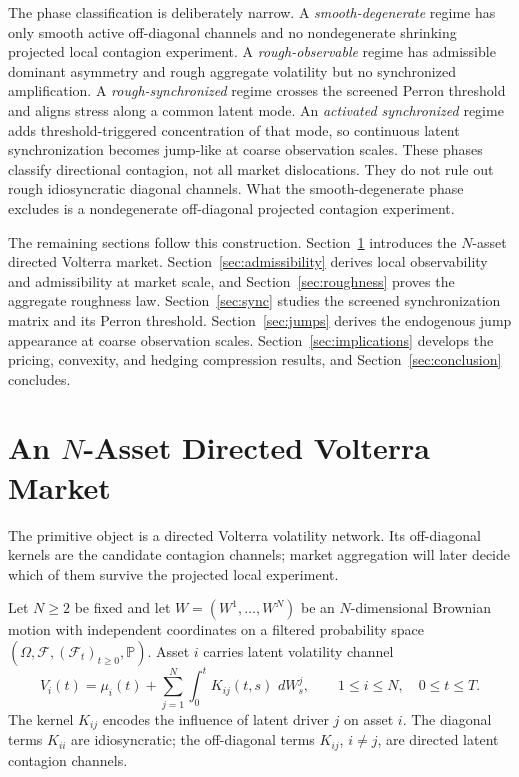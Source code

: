 \documentclass[11pt,a4paper]{amsart}
\theoremstyle{plain}
\theoremstyle{definition}
\theoremstyle{remark}
\newcommand{\PP}{\mathbb{P}}
\newcommand{\dd}{\,d}
\newcommand{\cF}{\mathcal{F}}
\begin{document}
The phase classification is deliberately narrow.  A \emph{smooth-degenerate} regime has only
smooth active off-diagonal channels and no nondegenerate shrinking projected local contagion
experiment.  A \emph{rough-observable} regime has admissible dominant asymmetry and rough aggregate
volatility but no synchronized amplification.  A \emph{rough-synchronized} regime crosses the
screened Perron threshold and aligns stress along a common latent mode.  An \emph{activated
synchronized} regime adds threshold-triggered concentration of that mode, so continuous latent
synchronization becomes jump-like at coarse observation scales.  These phases classify directional
contagion, not all market dislocations.  They do not rule out rough idiosyncratic diagonal
channels.  What the smooth-degenerate phase excludes is a nondegenerate off-diagonal projected
contagion experiment.

The remaining sections follow this construction.  Section~\ref{sec:model} introduces the
\(N\)-asset directed Volterra market.  Section~\ref{sec:admissibility} derives local observability
and admissibility at market scale, and Section~\ref{sec:roughness} proves the aggregate roughness
law.  Section~\ref{sec:sync} studies the screened synchronization matrix and its Perron threshold.
Section~\ref{sec:jumps} derives the endogenous jump appearance at coarse observation scales.
Section~\ref{sec:implications} develops the pricing, convexity, and hedging compression results,
and Section~\ref{sec:conclusion} concludes.
\section[\texorpdfstring{An N-Asset Directed Volterra Market}{An N-Asset Directed Volterra Market}]{\texorpdfstring{An \(N\)-Asset Directed Volterra Market}{An N-Asset Directed Volterra Market}}\label{sec:model}

The primitive object is a directed Volterra volatility network.  Its off-diagonal kernels are the
candidate contagion channels; market aggregation will later decide which of them survive the
projected local experiment.

Let \(N\ge2\) be fixed and let \(W=(W^1,\dots,W^N)\) be an \(N\)-dimensional Brownian motion with
independent coordinates on a filtered probability space
\((\Omega,\cF,(\cF_t)_{t\ge0},\PP)\).  Asset \(i\) carries latent volatility channel
\[
        V_i(t)
        =
        \mu_i(t)
        +
        \sum_{j=1}^N
        \int_0^t
        K_{ij}(t,s)\,\dd W^j_s,
        \qquad
        1\le i\le N,
        \quad
        0\le t\le T.
\]
The kernel \(K_{ij}\) encodes the influence of latent driver \(j\) on asset \(i\).  The diagonal
terms \(K_{ii}\) are idiosyncratic; the off-diagonal terms \(K_{ij}\), \(i\neq j\), are directed
latent contagion channels.
\end{document}
